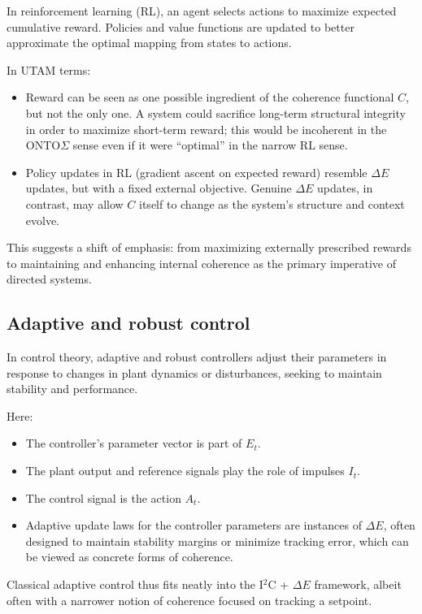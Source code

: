 \documentclass[12pt,a4paper]{report}
\begin{document}
In reinforcement learning (RL), an agent selects actions to maximize expected cumulative reward. Policies and value functions are updated to better approximate the optimal mapping from states to actions.

In UTAM terms:

\begin{itemize}[leftmargin=2em]
    \item Reward can be seen as one possible ingredient of the coherence functional \(C\), but not the only one. A system could sacrifice long-term structural integrity in order to maximize short-term reward; this would be incoherent in the ONTO$\Sigma$ sense even if it were ``optimal'' in the narrow RL sense.
    \item Policy updates in RL (gradient ascent on expected reward) resemble $\Delta E$ updates, but with a fixed external objective. Genuine $\Delta E$ updates, in contrast, may allow \(C\) itself to change as the system's structure and context evolve.
\end{itemize}

This suggests a shift of emphasis: from maximizing externally prescribed rewards to maintaining and enhancing internal coherence as the primary imperative of directed systems.

\subsection*{Adaptive and robust control}

In control theory, adaptive and robust controllers adjust their parameters in response to changes in plant dynamics or disturbances, seeking to maintain stability and performance.

Here:

\begin{itemize}[leftmargin=2em]
    \item The controller's parameter vector is part of \(E_t\).
    \item The plant output and reference signals play the role of impulses \(I_t\).
    \item The control signal is the action \(A_t\).
    \item Adaptive update laws for the controller parameters are instances of $\Delta E$, often designed to maintain stability margins or minimize tracking error, which can be viewed as concrete forms of coherence.
\end{itemize}

Classical adaptive control thus fits neatly into the I$^2$C + $\Delta E$ framework, albeit often with a narrower notion of coherence focused on tracking a setpoint.
\end{document}
